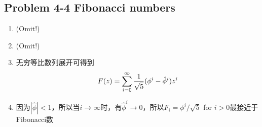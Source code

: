 \subsection*{Problem 4-4 Fibonacci numbers}
\begin{enumerate}
	\item	(Omit!)
	\item	(Omit!)
	\item	无穷等比数列展开可得到
		\begin{equation} \notag
			F(z)=\sum^{\infty}_{i=0}{\frac{1}{\sqrt{5}}(\phi ^i - \hat{\phi} ^i)z^i}
		\end{equation}
	\item	因为$|\hat{\phi}| < 1$，所以当$i \rightarrow \infty$时，有$\hat{\phi}^i \rightarrow 0$，所以$F_i=\phi ^i / \sqrt{5}$ for $i>0$最接近于Fibonacci数
\end{enumerate}

